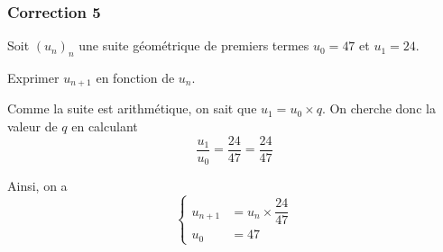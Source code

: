 \documentclass[15pt, mathserif]{beamer}
\begin{document}
\begin{frame}
\vspace{-10mm}
	\frametitle{Correction 5}
Soit $(u_n)_n$ une suite géométrique de premiers termes $u_0=47$ et $u_1=24$. 
 
 Exprimer $u_{n+1}$ en fonction de $u_n$. 
 
 \vspace*{1cm} 
 
 Comme la suite est arithmétique, on sait que $u_1=u_0\times q$. On cherche donc la valeur de $q$ en calculant $$\dfrac{u_1}{u_0}=\dfrac{24}{47}=\dfrac{24}{47}$$ 
 
 Ainsi, on a $$ \left\{ 
 \begin{array}{ll} 
 u_{n+1} &= u_n \times \dfrac{24}{47} \\ 
 u_0 & = 47 
 \end{array} 
 \right. $$ 
 \end{frame}
\end{document}
